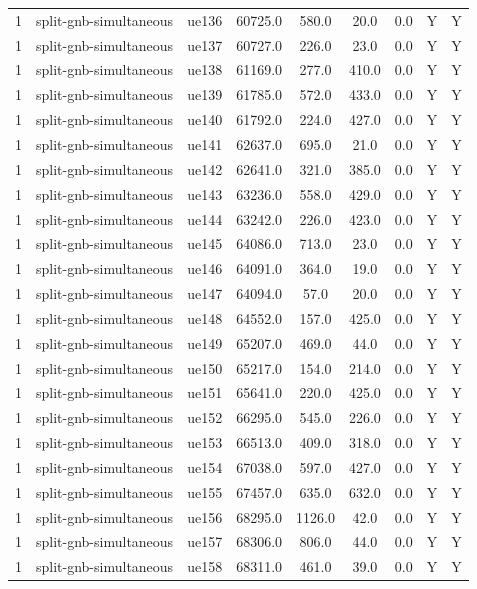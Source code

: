 \begin{table}[ht]
\begin{tabular}{|c|c|c|c|c|c|c|c|c|}
1 & split-gnb-simultaneous & ue136 & 60725.0 & 580.0 & 20.0 & 0.0 & Y & Y \\
1 & split-gnb-simultaneous & ue137 & 60727.0 & 226.0 & 23.0 & 0.0 & Y & Y \\
1 & split-gnb-simultaneous & ue138 & 61169.0 & 277.0 & 410.0 & 0.0 & Y & Y \\
1 & split-gnb-simultaneous & ue139 & 61785.0 & 572.0 & 433.0 & 0.0 & Y & Y \\
1 & split-gnb-simultaneous & ue140 & 61792.0 & 224.0 & 427.0 & 0.0 & Y & Y \\
1 & split-gnb-simultaneous & ue141 & 62637.0 & 695.0 & 21.0 & 0.0 & Y & Y \\
1 & split-gnb-simultaneous & ue142 & 62641.0 & 321.0 & 385.0 & 0.0 & Y & Y \\
1 & split-gnb-simultaneous & ue143 & 63236.0 & 558.0 & 429.0 & 0.0 & Y & Y \\
1 & split-gnb-simultaneous & ue144 & 63242.0 & 226.0 & 423.0 & 0.0 & Y & Y \\
1 & split-gnb-simultaneous & ue145 & 64086.0 & 713.0 & 23.0 & 0.0 & Y & Y \\
1 & split-gnb-simultaneous & ue146 & 64091.0 & 364.0 & 19.0 & 0.0 & Y & Y \\
1 & split-gnb-simultaneous & ue147 & 64094.0 & 57.0 & 20.0 & 0.0 & Y & Y \\
1 & split-gnb-simultaneous & ue148 & 64552.0 & 157.0 & 425.0 & 0.0 & Y & Y \\
1 & split-gnb-simultaneous & ue149 & 65207.0 & 469.0 & 44.0 & 0.0 & Y & Y \\
1 & split-gnb-simultaneous & ue150 & 65217.0 & 154.0 & 214.0 & 0.0 & Y & Y \\
1 & split-gnb-simultaneous & ue151 & 65641.0 & 220.0 & 425.0 & 0.0 & Y & Y \\
1 & split-gnb-simultaneous & ue152 & 66295.0 & 545.0 & 226.0 & 0.0 & Y & Y \\
1 & split-gnb-simultaneous & ue153 & 66513.0 & 409.0 & 318.0 & 0.0 & Y & Y \\
1 & split-gnb-simultaneous & ue154 & 67038.0 & 597.0 & 427.0 & 0.0 & Y & Y \\
1 & split-gnb-simultaneous & ue155 & 67457.0 & 635.0 & 632.0 & 0.0 & Y & Y \\
1 & split-gnb-simultaneous & ue156 & 68295.0 & 1126.0 & 42.0 & 0.0 & Y & Y \\
1 & split-gnb-simultaneous & ue157 & 68306.0 & 806.0 & 44.0 & 0.0 & Y & Y \\
1 & split-gnb-simultaneous & ue158 & 68311.0 & 461.0 & 39.0 & 0.0 & Y & Y \\

\end{tabular}
\end{table}
